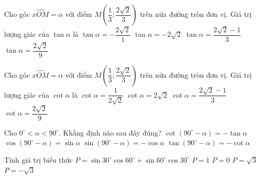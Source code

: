 \begin{ex}%
	Cho góc $\widehat{xOM}=\alpha$ với điểm $M\left(\dfrac{1}{3}; \dfrac{2\sqrt{2}}{3}\right)$ trên nửa đường tròn đơn vị. Giá trị lượng giác của $\tan \alpha$ là
	\choice
	{$\tan \alpha=-\dfrac{2\sqrt{2}}
			{1}$}
	{\True $\tan \alpha=-2\sqrt{2}$}
	{$\tan \alpha=\dfrac{2\sqrt{2}-1}{3}$}
	{$\tan \alpha=\dfrac{2\sqrt{2}}{9}$}
\end{ex}
\begin{ex}%
	Cho góc $\widehat{xOM}=\alpha$ với điểm $M\left(\dfrac{1}{3}; \dfrac{2\sqrt{2}}{3}\right)$ trên nửa đường tròn đơn vị. Giá trị lượng giác của $\cot \alpha$ là
	\choice
	{\True $\cot \alpha=\dfrac{1}
			{2\sqrt{2}}$}
	{$\cot \alpha=2\sqrt{2}$}
	{$\cot \alpha=\dfrac{2\sqrt{2}-1}{3}$}
	{$\cot \alpha=\dfrac{2\sqrt{2}}{9}$}
\end{ex}
\begin{ex}%
	Cho $0^{\circ}  < \alpha < 90^{\circ} $. Khẳng định nào sau đây đúng?
	\choice
	{$\cot \left(90^{\circ} -\alpha \right)=-\tan \alpha$}
	{\True $\cos \left(90^{\circ} -\alpha \right)=\sin \alpha$}
	{$\sin \left(90^{\circ} -\alpha \right)=-\cos \alpha$}
	{$\tan \left(90^{\circ} -\alpha \right)=-\cot \alpha$}
\end{ex}%
\begin{ex}%
	Tính giá trị biểu thức $P=\sin 30^{\circ} \cos 60^{\circ}+\sin 60^{\circ} \cos 30^{\circ}$
	\choice
	{\True $P=1$}
	{$P=0$}
	{$P=\sqrt{3}$}
	{$P=-\sqrt{3}$}
\end{ex}

